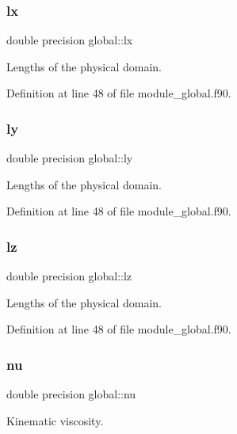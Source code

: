 \subsubsection{\texorpdfstring{lx}{lx}}
{\footnotesize\ttfamily double precision global\+::lx}



Lengths of the physical domain. 



Definition at line 48 of file module\+\_\+global.\+f90.

\mbox{\label{namespaceglobal_a6a6ee40bbab9e114aa217f7d8570b924}} 
\subsubsection{\texorpdfstring{ly}{ly}}
{\footnotesize\ttfamily double precision global\+::ly}



Lengths of the physical domain. 



Definition at line 48 of file module\+\_\+global.\+f90.

\mbox{\label{namespaceglobal_a9d90050855b894304d8b4272c6a9ee71}} 
\subsubsection{\texorpdfstring{lz}{lz}}
{\footnotesize\ttfamily double precision global\+::lz}



Lengths of the physical domain. 



Definition at line 48 of file module\+\_\+global.\+f90.

\mbox{\label{namespaceglobal_a48babc9c7f07053917ca1392e7a7b721}} 
\subsubsection{\texorpdfstring{nu}{nu}}
{\footnotesize\ttfamily double precision global\+::nu}



Kinematic viscosity. 



